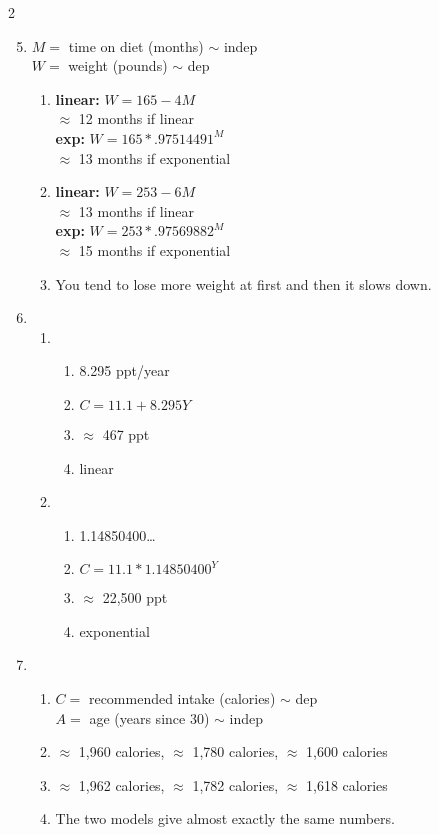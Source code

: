 \begin{multicols} {2}
\begin{enumerate}
\setcounter{enumi}{4}

\item %
$M=$ time on diet (months) $\sim$ indep \\ $W=$ weight (pounds) $\sim$ dep
\begin{enumerate}
\item \textbf{linear:} $W=165-4M$ \\ $\approx$ 12 months if linear \\
\textbf{exp:} $W=165 \ast .97514491^M$ \\ $\approx$ 13 months if exponential
\item \textbf{linear:} $W =253-6M $ \\$\approx$ 13 months if linear \\
\textbf{exp:} $W = 253\ast .97569882^M$ \\ $\approx$ 15 months if exponential
\item You tend to lose more weight at first and then it slows down.
\end{enumerate}

\item %
\begin{enumerate}
\item 
\begin{enumerate}
\item 8.295 ppt/year
\item $C=11.1 + 8.295Y$
\item $\approx$ 467 ppt
\item linear
\end{enumerate}
\item 
\begin{enumerate}
\item 1.14850400\ldots
\item $C=11.1\ast1.14850400^Y$
\item $\approx$ 22,500 ppt
\item exponential
\end{enumerate}
\end{enumerate}

\item %
\begin{enumerate}
\item $C=$ recommended intake (calories) $\sim$ dep \\ $A=$ age (years since 30) $\sim$ indep 
\item $\approx$ 1,960 calories, $\approx$ 1,780 calories, $\approx$ 1,600 calories
\item $\approx$ 1,962 calories, $\approx$ 1,782 calories, $\approx$ 1,618 calories
\item The two models give almost exactly the same numbers.
\end{enumerate}


\end{enumerate}
\end{multicols}
